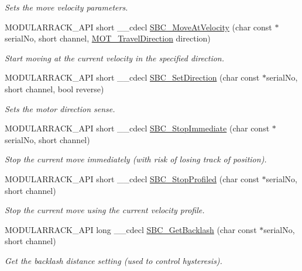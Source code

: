 \begin{DoxyCompactItemize}
\begin{DoxyCompactList}\small\item\em Sets the move velocity parameters. \end{DoxyCompactList}\item 
M\+O\+D\+U\+L\+A\+R\+R\+A\+C\+K\+\_\+\+A\+PI short \+\_\+\+\_\+cdecl \hyperlink{group___modular_stepper_ga0b818de20f91f3f069ce94c7dba0c4b1}{S\+B\+C\+\_\+\+Move\+At\+Velocity} (char const $\ast$serial\+No, short channel, \hyperlink{group___common_ga70a2a2ac296464f3d846c30d71d18daa}{M\+O\+T\+\_\+\+Travel\+Direction} direction)
\begin{DoxyCompactList}\small\item\em Start moving at the current velocity in the specified direction. \end{DoxyCompactList}\item 
M\+O\+D\+U\+L\+A\+R\+R\+A\+C\+K\+\_\+\+A\+PI short \+\_\+\+\_\+cdecl \hyperlink{group___modular_stepper_ga3b7c36dbd1967549c1092f1fb459c6fe}{S\+B\+C\+\_\+\+Set\+Direction} (char const $\ast$serial\+No, short channel, bool reverse)
\begin{DoxyCompactList}\small\item\em Sets the motor direction sense. \end{DoxyCompactList}\item 
M\+O\+D\+U\+L\+A\+R\+R\+A\+C\+K\+\_\+\+A\+PI short \+\_\+\+\_\+cdecl \hyperlink{group___modular_stepper_ga2c9a335c12ced84b89e25af0368a98d4}{S\+B\+C\+\_\+\+Stop\+Immediate} (char const $\ast$serial\+No, short channel)
\begin{DoxyCompactList}\small\item\em Stop the current move immediately (with risk of losing track of position). \end{DoxyCompactList}\item 
M\+O\+D\+U\+L\+A\+R\+R\+A\+C\+K\+\_\+\+A\+PI short \+\_\+\+\_\+cdecl \hyperlink{group___modular_stepper_ga92df2846820fe49556655662c2e8bebd}{S\+B\+C\+\_\+\+Stop\+Profiled} (char const $\ast$serial\+No, short channel)
\begin{DoxyCompactList}\small\item\em Stop the current move using the current velocity profile. \end{DoxyCompactList}\item 
M\+O\+D\+U\+L\+A\+R\+R\+A\+C\+K\+\_\+\+A\+PI long \+\_\+\+\_\+cdecl \hyperlink{group___modular_stepper_gadbb276fd7b2943baec01198b13978e8a}{S\+B\+C\+\_\+\+Get\+Backlash} (char const $\ast$serial\+No, short channel)
\begin{DoxyCompactList}\small\item\em Get the backlash distance setting (used to control hysteresis). \end{DoxyCompactList}\item 

\end{DoxyCompactItemize}
